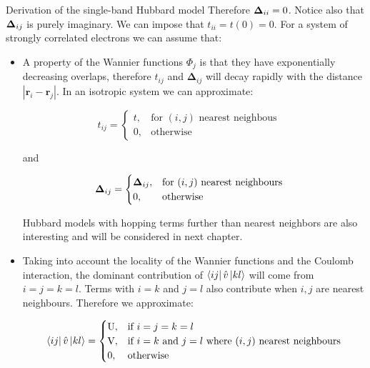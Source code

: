 \begin{section}{Derivation of the single-band Hubbard model}
Therefore $\boldsymbol{\Delta}_{ii} = 0$. Notice also that $\boldsymbol{\Delta}_{ij}$ is purely imaginary.
We can impose that $t_{ii} = t(0) = 0$. For a system of strongly correlated electrons we can assume that:

\begin{itemize}
\item A property of the Wannier functions $\Phi_j$ is that they have exponentially decreasing overlaps, therefore $t_{ij}$ and $\boldsymbol{\Delta}_{ij}$ will decay rapidly with the distance $|\textbf{r}_i-\textbf{r}_j|$. In an isotropic system we can approximate:

\begin{equation}
t_{ij} = \begin{cases}
             t,  & \text{for } (i,j) \text{ nearest neighbous} \\
             0,  & \text{otherwise}
       \end{cases} \quad
\end{equation}

and

\begin{equation}
\boldsymbol{\Delta}_{ij} = \begin{cases}
             \boldsymbol{\Delta}_{ij},  & \text{for } (i,j) \text{ nearest neighbours} \\
             0,  & \text{otherwise}
       \end{cases} \quad
\end{equation}

Hubbard models with hopping terms further than nearest neighbors are also interesting and will be considered in next chapter.  

\item Taking into account the locality of the Wannier functions and the Coulomb interaction, the dominant contribution of $\bra{ij} \hat{v} \ket{kl}$ will come from $i=j=k=l$. Terms with $i=k$ and $j=l$ also contribute when $i, j$ are nearest neighbours. Therefore we approximate:

\begin{equation}
\bra{ij} \hat{v} \ket{kl} =
	\begin{cases}
		\text{U}, & \text{if } i=j=k=l \\
		\text{V}, & \text{if } i=k \text{ and } j=l \text{ where } (i,j) \text{ nearest neighbours} \\
		0, & \text{otherwise}
	\end{cases}						
\end{equation}


\end{itemize}
\end{section}
